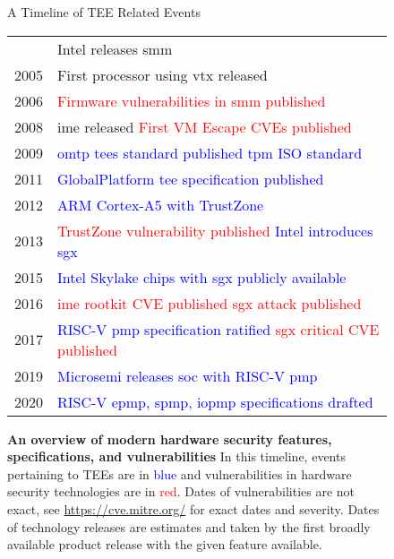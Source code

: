 \begin{figure}
\renewcommand\arraystretch{2}
\caption*{A Timeline of TEE Related Events}
\begin{tabular}{@{\,}r <{\hskip 2pt} !{\foo} >{\raggedright\arraybackslash}p{12cm}}
\toprule
{} & Intel releases \gls{smm} \\
2005 & First processor using \gls{vtx} released \\
2006 & \textcolor{red}{Firmware vulnerabilities in \gls{smm} published} \\
2008 & \gls{ime} released \linebreak \textcolor{red}{First VM Escape CVEs published} \\
2009 & \textcolor{blue}{\gls{omtp} \glspl{tee} standard published \linebreak \gls{tpm} ISO standard} \\
2011 & \textcolor{blue}{GlobalPlatform \gls{tee} specification published} \\
2012 & \textcolor{blue}{ARM Cortex-A5 with TrustZone} \\
2013 & \textcolor{red}{TrustZone vulnerability published} \linebreak \textcolor{blue}{Intel introduces \gls{sgx}} \\
2015 & \textcolor{blue}{Intel Skylake chips with \gls{sgx} publicly available} \\
2016 & \textcolor{red}{\gls{ime} rootkit CVE published} \linebreak \textcolor{red}{\gls{sgx} attack published} \cite{weichbrodt2016asyncshock} \\
2017 & \textcolor{blue}{RISC-V \gls{pmp} specification ratified} \linebreak \textcolor{red}{\gls{sgx} critical CVE published} \\
2019 & \textcolor{blue}{Microsemi releases \gls{soc} with RISC-V \gls{pmp}} \\
2020 & \textcolor{blue}{RISC-V \gls{epmp}, \gls{spmp}, \gls{iopmp} specifications drafted} \\
\end{tabular}
\vspace{5mm}
\caption[Hardware Security Timeline]{\textbf{An overview of modern hardware security features, specifications, and vulnerabilities} In this timeline, events pertaining to TEEs are in \textcolor{blue}{blue} and vulnerabilities in hardware security technologies are in \textcolor{red}{red}. Dates of vulnerabilities are not exact, see \url{https://cve.mitre.org/} for exact dates and severity. Dates of technology releases are estimates and taken by the first broadly available product release with the given feature available.}
\label{fig:mod_sec_hist}
\end{figure}
